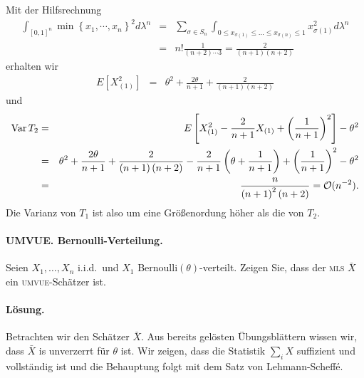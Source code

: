 Mit der Hilfsrechnung
\begin{eqnarray}
	\int_{[0,1]^n}^{} \min\left\{ x_1,\cdots,x_n \right\}^2 d\lambda^n 
	&=& \sum_{\sigma\in S_n}^{} \int_{0\leq x_{\sigma(1)}\leq \ldots \leq x_{\sigma(n)}\leq 1} x_{\sigma(1)}^2 d\lambda^n \\
	&=& n! \frac{1}{\left( n+2 \right)\cdots 3} = \frac{2}{\left( n+1 \right)\left( n+2 \right)}
\end{eqnarray}
erhalten wir
\begin{eqnarray}
	E\left[ X_{(1)}^2 \right] &=& \theta^2 +  \frac{2\theta}{n+1} + \frac{2}{\left( n+1 \right)\left( n+2 \right)}
\end{eqnarray}
und
\begin{eqnarray}
	\operatorname{Var} T_2 &=& E \left[ X_{(1)}^2 - \frac{2}{n+1}X_{(1)}+ \left( \frac{1}{n+1} \right)^2 \right] -\theta^2 \\
	&=& \theta^2 + \frac{2\theta}{n+1} + \frac{2}{\left( n+1 \right)\left( n+2 \right)} 
	- \frac{2}{n+1}\left( \theta + \frac{1}{n+1} \right) + \left( \frac{1}{n+1} \right)^2 -\theta^2 \\
	&=& \frac{n}{\left( n+1 \right)^2 \left( n+2 \right)} = \mathcal O (n^{-2}).
\end{eqnarray}
Die Varianz von $T_1$ ist also um eine Größenordung höher als die von $T_2$.




\paragraph{UMVUE. Bernoulli-Verteilung. } Seien $X_1,\ldots,X_n$
i.i.d.\ und $X_1$ Bernoulli$(\theta)$-verteilt. Zeigen Sie, dass der \textsc{mls}
$\bar X$ ein \textsc{umvue}-Schätzer ist.

\paragraph*{Lösung. } Betrachten wir den Schätzer $\bar X$. Aus bereits gelösten
Übungsblättern wissen wir, dass $\bar X$ is unverzerrt für $\theta$ ist.
Wir zeigen, dass die Statistik $\sum_{i}^{} X$ suffizient und vollständig ist und 
die Behauptung folgt mit dem Satz von Lehmann-Scheff\'e. 

